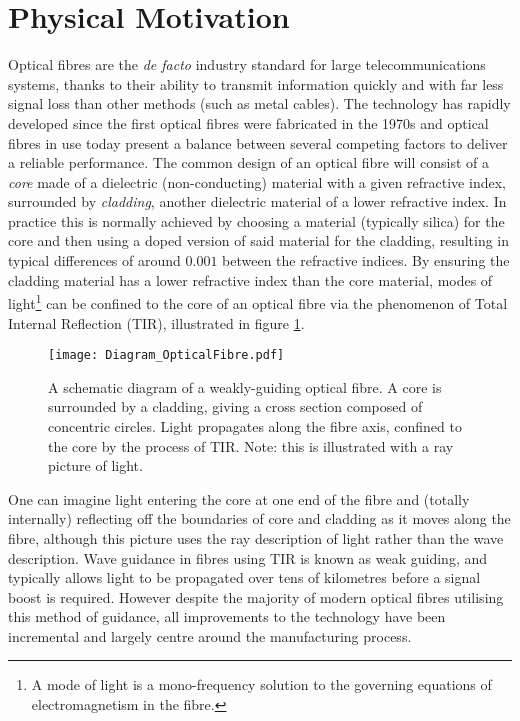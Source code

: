 \section{Physical Motivation} \label{sec:PhysMot}
Optical fibres are the \textit{de facto} industry standard for large telecommunications systems, thanks to their ability to transmit information quickly and with far less signal loss than other methods (such as metal cables).
The technology has rapidly developed since the first optical fibres were fabricated in the 1970s \cite{knight2003photonic} and optical fibres in use today present a balance between several competing factors to deliver a reliable performance.
The common design of an optical fibre will consist of a \emph{core} made of a dielectric (non-conducting) material with a given refractive index, surrounded by \emph{cladding}, another dielectric material of a lower refractive index.
In practice this is normally achieved by choosing a material (typically silica) for the core and then using a doped version of said material for the cladding, resulting in typical differences of around $0.001$ between the refractive indices.
By ensuring the cladding material has a lower refractive index than the core material, modes of light\footnote{A mode of light is a mono-frequency solution to the governing equations of electromagnetism in the fibre.} can be confined to the core of an optical fibre via the phenomenon of Total Internal Reflection (TIR), illustrated in figure \ref{fig:Diagram_OpticalFibre}.
\begin{figure}[t!]
	\centering
	\texttt{[image: Diagram\_OpticalFibre.pdf]}
	\caption[Illustration of a weakly-guiding optical fibre.]{\label{fig:Diagram_OpticalFibre} A schematic diagram of a weakly-guiding optical fibre. A core is surrounded by a cladding, giving a cross section composed of concentric circles. Light propagates along the fibre axis, confined to the core by the process of TIR. Note: this is illustrated with a ray picture of light.}
\end{figure} 
One can imagine light entering the core at one end of the fibre and (totally internally) reflecting off the boundaries of core and cladding as it moves along the fibre, although this picture uses the ray description of light rather than the wave description.
Wave guidance in fibres using TIR is known as weak guiding, and typically allows light to be propagated over tens of kilometres before a signal boost is required.
However despite the majority of modern optical fibres utilising this method of guidance, all improvements to the technology have been incremental and largely centre around the manufacturing process.

